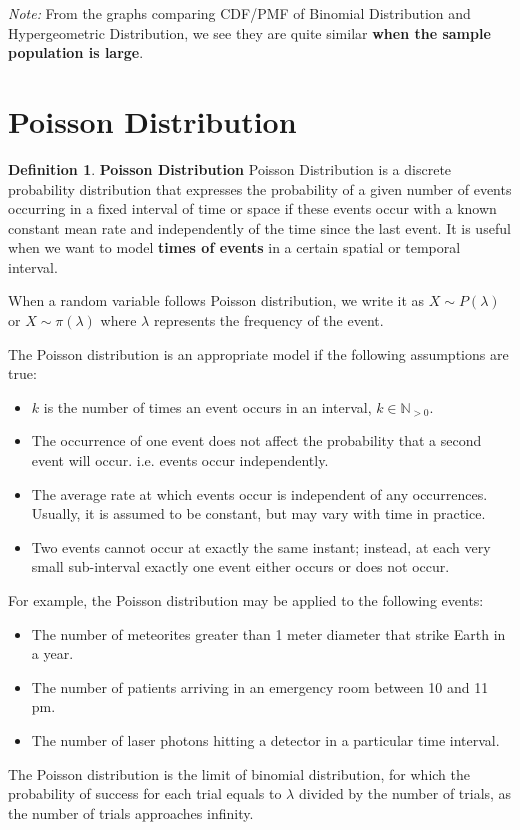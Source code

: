 \documentclass{article}
\theoremstyle{definition}
\newtheorem{defi}{Definition}[section]
\begin{document}
\textit{Note:} From the graphs comparing CDF/PMF of Binomial Distribution and Hypergeometric Distribution, we see they are quite similar \textbf{when the sample population is large}.

\section{Poisson Distribution}
\begin{defi}
\textbf{Poisson Distribution} Poisson Distribution is a discrete probability distribution that expresses the probability of a given number of events occurring in a fixed interval of time or space if these events occur with a known constant mean rate and independently of the time since the last event. It is useful when we want to model \textbf{times of events} in a certain spatial or temporal interval.

When a random variable follows Poisson distribution, we write it as $X\sim P(\lambda)$ or $X\sim \pi(\lambda)$ where $\lambda$ represents the frequency of the event.

The Poisson distribution is an appropriate model if the following assumptions are true:
\begin{itemize}
    \item $k$ is the number of times an event occurs in an interval, $k\in\mathbb{N}_{>0}$.
    \item The occurrence of one event does not affect the probability that a second event will occur. i.e. events occur independently.
    \item The average rate at which events occur is independent of any occurrences. Usually, it is assumed to be constant, but may vary with time in practice.
    \item Two events cannot occur at exactly the same instant; instead, at each very small sub-interval exactly one event either occurs or does not occur.
\end{itemize}

For example, the Poisson distribution may be applied to the following events:
\begin{itemize}
    \item The number of meteorites greater than 1 meter diameter that strike Earth in a year.
    \item The number of patients arriving in an emergency room between 10 and 11 pm.
    \item The number of laser photons hitting a detector in a particular time interval.
\end{itemize}

The Poisson distribution is the limit of binomial distribution, for which the probability of success for each trial equals to $\lambda$ divided by the number of trials, as the number of trials approaches infinity.

\end{defi}
\end{document}
